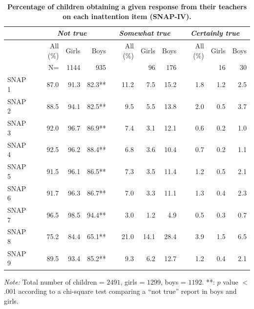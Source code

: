\documentclass[10pt,letterpaper]{article}
\begin{document}
\begin{table}[!ht]
\begin{adjustwidth}{-5mm}{0in} %
\centering
\caption{ \bf Percentage of children obtaining a given response from their teachers on each inattention item (SNAP-IV).} 
\vspace{5mm}
\begin{tabular}{|lrrr|rrr|rrr|}
\hline
                & \multicolumn{3}{c|}{\emph{Not true}}  &  \multicolumn{3}{c}{\emph{Somewhat true}}\ &  \multicolumn{3}{|c|}{\emph{Certainly true}}\\ \hline
                    & All  (\%) & Girls & Boys  & All (\%)  & Girls & Boys & All  (\%) & Girls & Boys\\  
                    & N=& 1144 & 935 &&96 & 176 && 16 & 30\\\hline
SNAP 1  & 87.0 & 91.3 & 82.3**  & 11.2 & 7.5   & 15.2  & 1.8 & 1.2 & 2.5\\  \hline
SNAP 2  &88.5 & 94.1   & 82.5** & 9.5 & 5.5 & 13.8 & 2.0 & 0.5 & 3.7\\  \hline
SNAP 3  & 92.0  &  96.7 &  86.9** & 7.4 & 3.1 & 12.1 & 0.6 & 0.2 & 1.0 \\   \hline
SNAP 4  & 92.5  & 96.2   & 88.4**  & 6.8 & 3.6 & 10.4 & 0.7& 0.2 & 1.1 \\   \hline
SNAP 5  &  91.5 & 96.1 & 86.5**  & 7.3 & 3.5  & 11.4  &1.2 & 0.5 & 2.1  \\   \hline
SNAP 6  & 91.7 & 96.3 & 86.7**  & 7.0 & 3.3 & 11.1 & 1.3 & 0.4 & 2.3 \\   \hline
SNAP 7  & 96.5 & 98.5   & 94.4**   & 3.0  & 1.2 & 4.9 & 0.5 & 0.3 & 0.7 \\   \hline
SNAP 8  & 75.2 & 84.4   & 65.1**  & 21.0  & 14.1  & 28.4 &  3.9 & 1.5 & 6.5\\    \hline
SNAP 9  & 89.5 & 93.4 & 85.2** & 9.3 & 6.2 & 12.7 & 1.2 & 0.4  & 2.1 \\  \hline
\end{tabular}
\label{Numerical_SNAP}
\end{adjustwidth}
\textit{Note:} {Total number of children = $2491$, girls = $1299$, boys = $1192$.  **: $p$ value $<$.001 according to a chi-square test comparing a ``not true'' report in boys and girls.} \\ 
\end{table}
\end{document}
